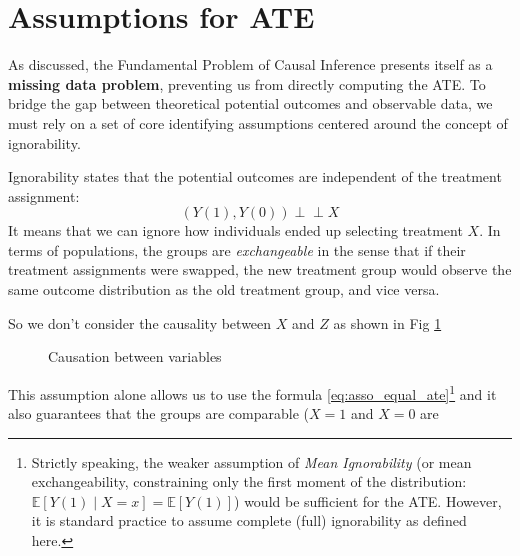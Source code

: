 \section{Assumptions for ATE}
As discussed, the Fundamental Problem of Causal Inference presents itself as a 
\textbf{missing data problem}, preventing us from directly computing the ATE. 
To bridge the gap between theoretical potential outcomes and observable data, 
we must rely on a set of core identifying assumptions centered around the concept of ignorability.
\newline
\begin{definition}
Ignorability states that the potential outcomes are independent of the treatment assignment:
\[
\left(Y(1), Y(0)\right) \perp\!\!\!\perp X
\]
It means that we can ignore how individuals ended up selecting treatment $X$. In terms of populations, the groups are \emph{exchangeable} in the sense that if their treatment assignments were swapped, the new treatment group would observe the same outcome distribution as the old treatment group, and vice versa.
\end{definition}
So we don't consider the causality between $X$ and $Z$ as shown in Fig \ref{fig:ignorability_graph}
\begin{figure}[htbp]
    \centering
    \caption{Causation between variables}
    \label{fig:ignorability_graph}
\end{figure}
\newline
This assumption alone allows us to use the formula \ref{eq:asso_equal_ate}\footnote{Strictly speaking,
the weaker assumption of \emph{Mean Ignorability} (or mean exchangeability, 
constraining only the first moment of the distribution: $\mathbb{E}[Y(1)\mid X=x] = \mathbb{E}[Y(1)]$)
would be sufficient for the ATE. However, it is standard practice to assume complete (full) 
ignorability as defined here.} and it also guarantees that the groups are comparable ($X=1$ and $X=0$ are
